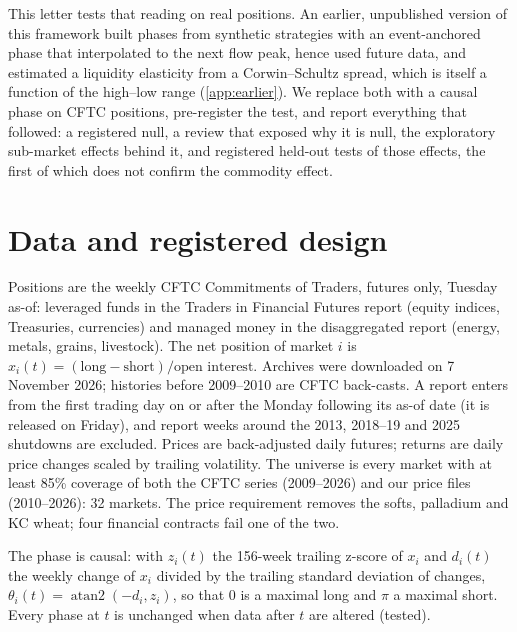 \documentclass[preprint,12pt,authoryear]{elsarticle}
\begin{document}
This letter tests that reading on real positions. An earlier, unpublished
version of this framework built phases from synthetic strategies with an
event-anchored phase that interpolated to the next flow peak, hence used
future data, and estimated a liquidity elasticity from a Corwin--Schultz
spread, which is itself a function of the high--low range
(\ref{app:earlier}). We replace both with a causal phase on CFTC
positions, pre-register the test, and report everything that followed:
a registered null, a review that exposed why it is null, the exploratory
sub-market effects behind it, and registered held-out tests of those
effects, the first of which does not confirm the commodity effect.

\section{Data and registered design}
\label{sec:design}

Positions are the weekly CFTC Commitments of Traders, futures only, Tuesday
as-of: leveraged funds in the Traders in Financial Futures report (equity
indices, Treasuries, currencies) and managed money in the disaggregated
report (energy, metals, grains, livestock). The net position of market $i$ is
$x_i(t) = (\text{long} - \text{short})/\text{open interest}$. Archives were
downloaded on 7 November 2026; histories before 2009--2010 are CFTC back-casts.
A report enters from the first trading day on or after the Monday following
its as-of date (it is released on Friday), and report weeks around the 2013,
2018--19 and 2025 shutdowns are excluded. Prices are back-adjusted daily
futures; returns are daily price changes scaled by trailing volatility. The
universe is every market with at least 85\% coverage of both the CFTC series
(2009--2026) and our price files (2010--2026): 32 markets. The price
requirement removes the softs, palladium and KC wheat; four financial
contracts fail one of the two.

The phase is causal: with $z_i(t)$ the 156-week trailing z-score of $x_i$ and
$d_i(t)$ the weekly change of $x_i$ divided by the trailing standard deviation
of changes, $\theta_i(t) = \operatorname{atan2}(-d_i, z_i)$, so that 0 is a
maximal long and $\pi$ a maximal short. Every phase at $t$ is unchanged when
data after $t$ are altered (tested).
\end{document}

